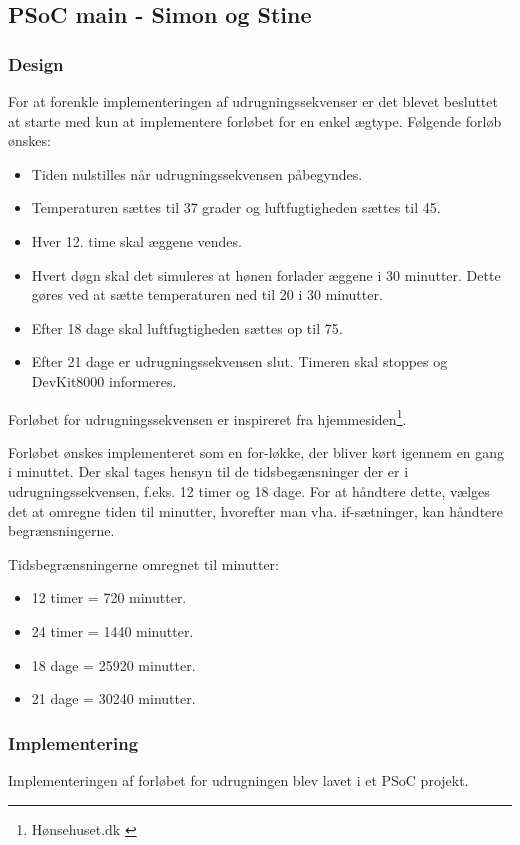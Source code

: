 \newpage
\subsection{PSoC main - Simon og Stine}

\subsubsection{Design}

For at forenkle implementeringen af udrugningssekvenser er det blevet besluttet
at starte med kun at implementere forløbet for en enkel ægtype. 
Følgende forløb ønskes:

\begin{itemize}
  \item Tiden nulstilles når udrugningssekvensen påbegyndes.
  \item Temperaturen sættes til 37 grader og luftfugtigheden sættes til 45.
  \item Hver 12. time skal æggene vendes.
  \item Hvert døgn skal det simuleres at hønen forlader æggene i 30 minutter. Dette gøres ved at sætte temperaturen ned til 20 i 30 minutter.
  \item Efter 18 dage skal luftfugtigheden sættes op til 75.
  \item Efter 21 dage er udrugningssekvensen slut. Timeren skal stoppes og DevKit8000 informeres.
\end{itemize}
Forløbet for udrugningssekvensen er inspireret fra hjemmesiden\footnote{Hønsehuset.dk \cite{Rugetips}}.

Forløbet ønskes implementeret som en for-løkke, der bliver kørt igennem en gang i minuttet.
Der skal tages hensyn til de tidsbegænsninger der er i udrugningssekvensen, f.eks. 12 timer og 18 dage.
For at håndtere dette, vælges det at omregne tiden til minutter, hvorefter man vha. if-sætninger, kan håndtere begrænsningerne.

Tidsbegrænsningerne omregnet til minutter:
\begin{itemize}
  \item 12 timer = 720 minutter.
  \item 24 timer = 1440 minutter.
  \item 18 dage = 25920 minutter.
  \item 21 dage = 30240 minutter.
\end{itemize}


\subsubsection{Implementering}
Implementeringen af forløbet for udrugningen blev lavet i et PSoC projekt.

